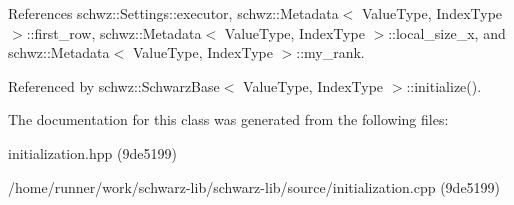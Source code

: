 References schwz\+::\+Settings\+::executor, schwz\+::\+Metadata$<$ Value\+Type, Index\+Type $>$\+::first\+\_\+row, schwz\+::\+Metadata$<$ Value\+Type, Index\+Type $>$\+::local\+\_\+size\+\_\+x, and schwz\+::\+Metadata$<$ Value\+Type, Index\+Type $>$\+::my\+\_\+rank.



Referenced by schwz\+::\+Schwarz\+Base$<$ Value\+Type, Index\+Type $>$\+::initialize().



The documentation for this class was generated from the following files\+:\begin{DoxyCompactItemize}
\item 
initialization.\+hpp (9de5199)\item 
/home/runner/work/schwarz-\/lib/schwarz-\/lib/source/initialization.\+cpp (9de5199)\end{DoxyCompactItemize}
